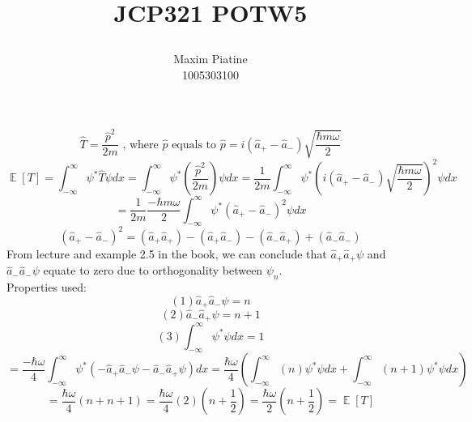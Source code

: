 \documentclass[11pt]{article}
\title{\textbf{JCP321 POTW5}
\author{Maxim Piatine\\1005303100}}
\date{}
\DeclareMathOperator*{\E}{\mathbb{E}}
\begin{document}
\maketitle
\[\hat{T}=\frac{\hat{p}^2}{2m} \text{ , where $\hat{p}$ equals to } \hat{p}=i(\hat{a}_+-\hat{a}_-)\sqrt{\frac{\hbar m \omega}{2}}\]
\[\E[T]=\int^\infty_{-\infty}\psi^*\hat{T}\psi dx = 
\int^\infty_{-\infty}\psi^*\left(\frac{\hat{p}^2}{2m}\right)\psi dx=
\frac{1}{2m}\int^\infty_{-\infty}\psi^*\left(i(\hat{a}_+-\hat{a}_-)\sqrt{\frac{\hbar m \omega}{2}}\right)^2\psi dx\]
\[=\frac{1}{2m}\frac{-\hbar m \omega}{2}\int^\infty_{-\infty}\psi^*(\hat{a}_+-\hat{a}_-)^2\psi dx\]
\[(\hat{a}_+-\hat{a}_-)^2=(\hat{a}_+\hat{a}_+) - (\hat{a}_+\hat{a}_-) - (\hat{a}_- \hat{a}_+) + (\hat{a}_-\hat{a}_-)\]
From lecture and example 2.5 in the book, we can conclude that $\hat{a}_+\hat{a}_+ \psi$ and $\hat{a}_-\hat{a}_- \psi$ equate to zero due to orthogonality between $\psi_n$.
\vspace{5mm}
\\Properties used: 
\[(1)\hat{a}_+\hat{a}_-\psi = n\]
\[(2)\hat{a}_-\hat{a}_+\psi = n+1\]
\[(3)\int^\infty_{-\infty}\psi^*\psi dx= 1\]
\vspace{5mm}
\[=\frac{-\hbar \omega}{4}\int^\infty_{-\infty}\psi^*(-\hat{a}_+\hat{a}_-\psi-\hat{a}_-\hat{a}_+\psi) dx=
\frac{\hbar \omega}{4}\left( \int^\infty_{-\infty}(n)\psi^*\psi dx + \int^\infty_{-\infty}(n+1)\psi^*\psi dx\right)\]
\[=\frac{\hbar \omega}{4}(n+n+1)=\frac{\hbar \omega}{4}(2)(n+\frac{1}{2})=\frac{\hbar \omega}{2}(n+\frac{1}{2})=\E[T]\]
\end{document}
